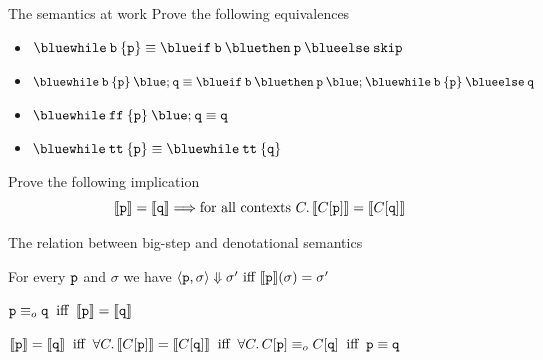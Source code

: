 \documentclass{beamer}
\begin{document}
\begin{frame}{The semantics at work}
        Prove the following equivalences
        \begin{itemize}
                \item $\mathtt{{\blue while} \> b \> \{ p \} } \equiv
                      \mathtt{{\blue if} \> b \> {\blue then} \> p \> {\blue else} \> skip}$
                \item $\mathtt{{\blue while} \> b \> \{ p \} } \> {\blue ;} \> \mathtt{q} \equiv
                      \mathtt{{\blue if} \> b \> {\blue then} \> p \> {\blue ;}  \> {\blue while} \> b \> \{ p \}
                      \> {\blue else} \> q}$
                \item $\mathtt{{\blue while} \> ff \> \{ p \} \> {\blue ;} \> q } \equiv \mathtt{q}$
                \item $\mathtt{{\blue while} \> tt \> \{ p \} } \equiv
                      \mathtt{{\blue while} \> tt \> \{ q \} }$

        \end{itemize}

        \pause
        \smallskip
        Prove the following implication
        \[
                \llbracket \mathtt{p} \rrbracket = \llbracket \mathtt{q} \rrbracket \Longrightarrow
                \text{for all contexts } C. \,
                \llbracket C[\mathtt{p}] \rrbracket = \llbracket C[\mathtt{q}] \rrbracket
        \]
\end{frame}

\begin{frame}{The relation between big-step and denotational semantics}

        \vfill
        \begin{theorem}
                For every $\mathtt{p}$ and $\sigma$ we
                have 
                $\langle \mathtt{p}, \sigma \rangle \Downarrow \sigma' \text{ iff }
                \llbracket \mathtt{p} \rrbracket(\sigma) = \sigma'$
        \end{theorem}

        \bigskip
        \bigskip
        \begin{corollary}
                $\mathtt{p} \equiv_o \mathtt{q} \> \text{ iff } \> \llbracket \mathtt{p} \rrbracket =
                \llbracket \mathtt{q} \rrbracket$
        \end{corollary}

        \bigskip
        \bigskip
        \begin{corollary}
                $
                \llbracket \mathtt{p} \rrbracket = \llbracket \mathtt{q} \rrbracket \> \text{ iff } \>
                \forall C. \, \llbracket C[\mathtt{p}] \rrbracket = \llbracket C[\mathtt{q}] \rrbracket 
                \> \text{ iff } \>
                \forall C. \, C[\mathtt{p}] \equiv_o C[\mathtt{q}]
                \> \text{ iff } \>
                \mathtt{p} \equiv \mathtt{q}
                $
        \end{corollary}

\end{frame}



\end{document}
